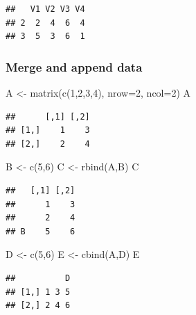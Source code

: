 \documentclass[]{article}
\newenvironment{Shaded}{\begin{snugshade}}{\end{snugshade}}
\newcommand{\AttributeTok}[1]{\textcolor[rgb]{0.77,0.63,0.00}{#1}}
\newcommand{\DecValTok}[1]{\textcolor[rgb]{0.00,0.00,0.81}{#1}}
\newcommand{\FunctionTok}[1]{\textcolor[rgb]{0.00,0.00,0.00}{#1}}
\newcommand{\NormalTok}[1]{#1}
\newcommand{\OtherTok}[1]{\textcolor[rgb]{0.56,0.35,0.01}{#1}}
\begin{document}
\begin{verbatim}
##   V1 V2 V3 V4
## 2  2  4  6  4
## 3  5  3  6  1
\end{verbatim}

\hypertarget{merge-and-append-data}{%
\subsubsection{Merge and append data}\label{merge-and-append-data}}

\begin{Shaded}
\begin{Highlighting}[]
\NormalTok{A }\OtherTok{\textless{}{-}} \FunctionTok{matrix}\NormalTok{(}\FunctionTok{c}\NormalTok{(}\DecValTok{1}\NormalTok{,}\DecValTok{2}\NormalTok{,}\DecValTok{3}\NormalTok{,}\DecValTok{4}\NormalTok{), }\AttributeTok{nrow=}\DecValTok{2}\NormalTok{, }\AttributeTok{ncol=}\DecValTok{2}\NormalTok{)}
\NormalTok{A}
\end{Highlighting}
\end{Shaded}

\begin{verbatim}
##      [,1] [,2]
## [1,]    1    3
## [2,]    2    4
\end{verbatim}

\begin{Shaded}
\begin{Highlighting}[]
\NormalTok{B }\OtherTok{\textless{}{-}} \FunctionTok{c}\NormalTok{(}\DecValTok{5}\NormalTok{,}\DecValTok{6}\NormalTok{)}
\NormalTok{C }\OtherTok{\textless{}{-}} \FunctionTok{rbind}\NormalTok{(A,B)}
\NormalTok{C}
\end{Highlighting}
\end{Shaded}

\begin{verbatim}
##   [,1] [,2]
##      1    3
##      2    4
## B    5    6
\end{verbatim}

\begin{Shaded}
\begin{Highlighting}[]
\NormalTok{D }\OtherTok{\textless{}{-}} \FunctionTok{c}\NormalTok{(}\DecValTok{5}\NormalTok{,}\DecValTok{6}\NormalTok{)}
\NormalTok{E }\OtherTok{\textless{}{-}} \FunctionTok{cbind}\NormalTok{(A,D)}
\NormalTok{E}
\end{Highlighting}
\end{Shaded}

\begin{verbatim}
##          D
## [1,] 1 3 5
## [2,] 2 4 6
\end{verbatim}
\end{document}
